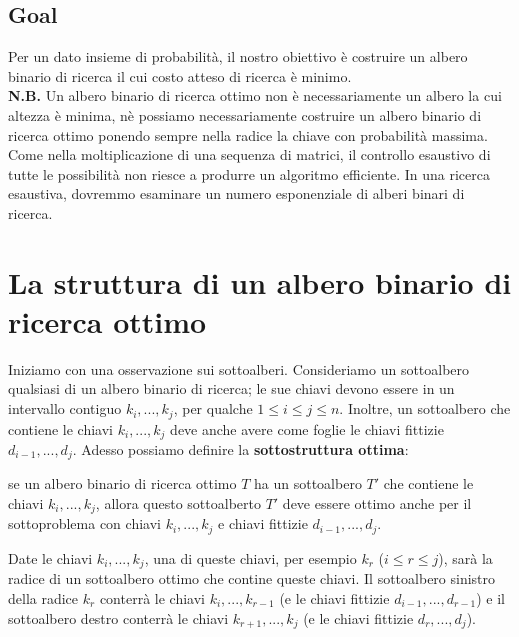 \subsection{Goal}

Per un dato insieme di probabilità, il nostro obiettivo è costruire un
albero binario di ricerca il cui costo atteso di ricerca è minimo.\\

\textbf{N.B.} Un albero binario di ricerca ottimo non è necessariamente
un albero la cui altezza è minima, nè possiamo necessariamente costruire
un albero binario di ricerca ottimo ponendo sempre nella radice la
chiave con probabilità massima.\\

Come nella moltiplicazione di una sequenza di matrici, il controllo
esaustivo di tutte le possibilità non riesce a produrre un algoritmo
efficiente. In una ricerca esaustiva, dovremmo esaminare un numero
esponenziale di alberi binari di ricerca.


\section{La struttura di un albero binario di ricerca ottimo}

Iniziamo con una osservazione sui sottoalberi. Consideriamo un
sottoalbero qualsiasi di un albero binario di ricerca; le sue chiavi
devono essere in un intervallo contiguo $k_i, ..., k_j$, per qualche
$1 \le i \le j \le n$. Inoltre, un sottoalbero che contiene le chiavi
$k_i, ..., k_j$ deve anche avere come foglie le chiavi fittizie
$d_{i-1}, ..., d_j$. Adesso possiamo definire la
\textbf{sottostruttura ottima}:
\begin{myblockquote}
    se un albero
    binario di ricerca ottimo $T$ ha un sottoalbero $T'$ che contiene le
    chiavi $k_i, ..., k_j$, allora questo sottoalberto $T'$ deve essere
    ottimo anche per il sottoproblema con chiavi $k_i, ..., k_j$ e chiavi
    fittizie $d_{i-1}, ..., d_j$.
\end{myblockquote}
Date le chiavi $k_i, ..., k_j$, una di queste chiavi, per esempio
$k_r$ ($i \le r \le j$), sarà la radice di un sottoalbero ottimo che
contine queste chiavi. Il sottoalbero sinistro della radice $k_r$
conterrà le chiavi $k_i, ..., k_{r-1}$ (e le chiavi fittizie
$d_{i-1}, ..., d_{r-1}$) e il sottoalbero destro conterrà le chiavi
$k_{r+1}, ..., k_j$ (e le chiavi fittizie $d_{r}, ..., d_{j}$).\\

